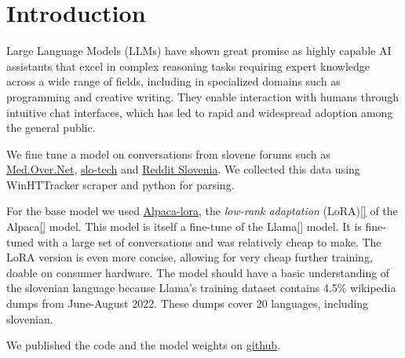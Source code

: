 \documentclass[fleqn,moreauthors,10pt]{ds_report}
\affiliation{\textit{Advisors: Slavko Žitnik}}
\begin{document}
\flushbottom 

\maketitle 

\thispagestyle{empty} 


\section*{Introduction}
Large Language Models (LLMs) have shown great promise as highly capable AI assistants that excel in complex reasoning tasks requiring expert knowledge across a wide range of fields, including in specialized domains such as programming and creative writing. They enable interaction with humans through intuitive chat interfaces, which has led to rapid and widespread adoption among the general public.

We fine tune a model on conversations from slovene forums such as \href{https://forum.over.net/forum/}{Med.Over.Net}, \href{www.slo-tech.com}{slo-tech} and \href{https://www.reddit.com/r/Slovenia/}{Reddit Slovenia}. We collected this data using WinHTTracker scraper and python for parsing.

For the base model we used \href{https://github.com/tloen/alpaca-lora}{Alpaca-lora}, the \emph{low-rank adaptation} (LoRA)\ref{} of the Alpaca\ref{} model. This model is itself a fine-tune of the Llama\ref{} model. It is fine-tuned with a large set of conversations and was relatively cheap to make. The LoRA version is even more concise, allowing for very cheap further training, doable on consumer hardware.
The model should have a basic understanding of the slovenian language because Llama's training dataset contains 4.5\% wikipedia dumps from June-August 2022. These dumps cover 20 languages, including slovenian.

We published the code and the model weights on \href{https://github.com/UL-FRI-NLP-2023-2024/ul-fri-nlp-course-project-tree-pipit/}{github}.

\end{document}
